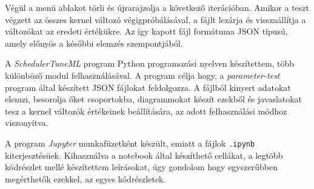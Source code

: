 Végül a menü ablakot törli és újrarajzolja a következő iterációban.
Amikor a teszt végzett az összes kernel változó végigpróbálásával, a fájlt lezárja és visszaállítja a változókat az eredeti értékükre.
Az így kapott fájl formátuma JSON típusú, amely előnyös a későbbi elemzés szempontjából.


A \textit{SchedulerTuneML} program Python programozási nyelven készítettem, több különböző modul felhasználásával.
A program célja hogy, a \textit{parameter-test} program által készített JSON fájlokat feldolgozza. A fájlból kinyert adatokat elemzi, besorolja őket csoportokba, diagrammokat készít ezekből és javaslatokat tesz a kernel változók értékeinek beállítására, az adott felhasználási módhoz viszonyítva.


A program \textit{Jupyter} munkafüzetként készült, emiatt a fájlok \texttt{.ipynb} kiterjesztésüek. Kihasználva a notebook által készíthető cellákat, a legtöbb kódrészlet mellé készítettem leírásokat, úgy gondolom hogy egyszerűbben megérthetők ezekkel, az egyes kódrészletek.

